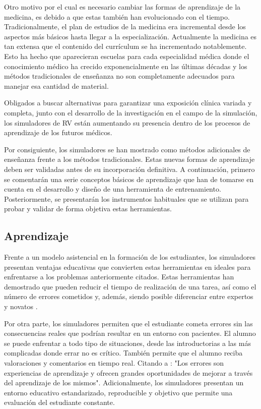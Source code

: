 Otro motivo por el cual es necesario cambiar las formas de aprendizaje de la medicina, es debido a que estas también han evolucionado con el tiempo.
Tradicionalmente, el plan de estudios de la medicina era incremental desde los aspectos más básicos hasta llegar a la especialización. Actualmente la medicina es tan extensa que el contenido del currículum se ha incrementado notablemente. Esto ha hecho que aparecieran escuelas para cada especialidad médica donde el conocimiento médico ha crecido exponencialmente en las últimas décadas y los métodos tradicionales de enseñanza no son completamente adecuados para manejar esa cantidad de material.

Obligados a buscar alternativas para garantizar una exposición clínica variada y completa, junto con el desarrollo de la investigación en el campo de la simulación, los simuladores de \ac{RV} están aumentando su presencia dentro de los procesos de aprendizaje de los futuros médicos.

Por consiguiente, los simuladores se han mostrado como métodos adicionales de enseñanza frente a los métodos tradicionales. Estas nuevas formas de aprendizaje deben ser validadas antes de su incorporación definitiva. A continuación, primero se comentarán una serie conceptos básicos de aprendizaje que han de tomarse en cuenta en el desarrollo y diseño de una herramienta de entrenamiento. Posteriormente, se presentarán los instrumentos habituales que se utilizan para probar y validar de forma objetiva estas herramientas.


\subsection{Aprendizaje}

Frente a un modelo asistencial en la formación de los estudiantes, los simuladores presentan  ventajas educativas que convierten estas herramientas en ideales para enfrentarse a los problemas anteriormente citados. Estas herramientas han demostrado que pueden reducir el tiempo de realización de una tarea, así como el número de errores cometidos y, además, siendo posible diferenciar entre expertos y novatos \cite{Gurusamy08}.

Por otra parte, los simuladores permiten que el estudiante cometa errores sin las consecuencias reales que podrían resultar en un entorno con pacientes. El alumno se puede enfrentar a todo tipo de situaciones, desde las introductorias a las más complicadas donde errar no es crítico. También permite que el alumno reciba valoraciones y comentarios en tiempo real. Citando a \cite{ziv2008educacion}: "Los errores son experiencias de aprendizaje y ofrecen grandes oportunidades de mejorar a través del aprendizaje de los mismos". Adicionalmente, los simuladores presentan un entorno educativo estandarizado, reproducible y objetivo que permite una evaluación del estudiante constante.

